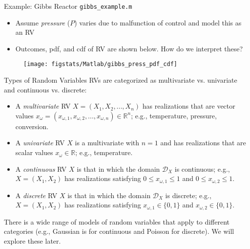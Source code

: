 \documentclass[handout,9pt]{beamer}
\begin{document}
\begin{frame}{Example: Gibbs Reactor \footnotesize{\texttt{gibbs\_example.m}}}

\begin{itemize}
 \setlength{\itemsep}{10pt}
\item Assume {\em pressure} ($P$) varies due to malfunction of control and model this as an RV
\item Outcomes, pdf, and cdf of RV are shown below. How do we interpret these? 
\end{itemize}
\begin{figure}[!htb]
    \centering
	\texttt{[image: figstats/Matlab/gibbs\_press\_pdf\_cdf]}
\end{figure}

\end{frame}

\begin{frame}{Types of Random Variables}
RVs are categorized as multivariate vs. univariate and continuous vs. discrete:

\begin{block}{}
\begin{itemize}
 \setlength{\itemsep}{10pt}
\item A {\em multivariate} RV $X=(X_{1},X_{2},...,X_n)$ has realizations that are vector values $x_{\omega}=(x_{\omega,1},x_{\omega,2},...,x_{\omega,n})\in \mathbb{R}^n$; e.g., temperature, pressure, conversion.
\item A {\em univariate} RV $X$ is a multivariate with $n=1$ and has realizations that are scalar values $x_\omega\in \mathbb{R}$; e.g., temperature.
\item A {\em continuous} RV $X$ is that in which the domain $\mathcal{D}_X$ is continuous; e.g., $X=(X_1,X_2)$ has realizations satisfying $0\leq x_{\omega,1}\leq 1$ and $0\leq x_{\omega,2}\leq 1$.
\item A {\em discrete} RV $X$ is that in which the domain $\mathcal{D}_X$ is discrete; e.g., $X=(X_1,X_2)$ has realizations satisfying $x_{\omega,1}\in \{0,1\}$ and $x_{\omega,2}\in \{0,1\}$.
\end{itemize}
\end{block}
There is a wide range of models of random variables that apply to different categories (e.g., Gaussian is for continuous and Poisson for discrete). We will explore these later.  
\end{frame}
\end{document}
